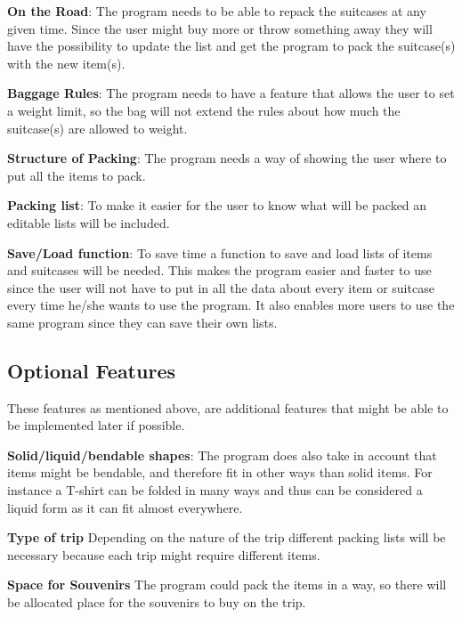 \textbf{On the Road}:
The program needs to be able to repack the suitcases at any given time. Since the user might buy more or throw something away they will have the possibility to update the list and get the program to pack the suitcase(s) with the new item(s).
\newline

\textbf{Baggage Rules}:
The program needs to have a feature that allows the user to set a weight limit, so the bag will not extend the rules about how much the suitcase(s) are allowed to weight.
\newline

\textbf{Structure of Packing}:
The program needs a way of showing the user where to put all the items to pack.
\newline

\textbf{Packing list}:
To make it easier for the user to know what will be packed an editable lists will be included.
\newline

\textbf{Save/Load function}:
To save time a function to save and load lists of items and suitcases will be needed. This makes the program easier and faster to use since the user will not have to put in all the data about every item or suitcase every time he/she wants to use the program. It also enables more users to use the same program since they can save their own lists.
\newline

\subsection{Optional Features}
These features as mentioned above, are additional features that might be able to be implemented later if possible.\newline

\textbf{Solid/liquid/bendable shapes}:
The program does also take in account that items might be bendable, and therefore fit in other ways than solid items. For instance a T-shirt can be folded in many ways and thus can be considered a liquid form as it can fit almost everywhere.
\newline

\textbf{Type of trip}
Depending on the nature of the trip different packing lists will be necessary because each trip might require different items.
\newline

\textbf{Space for Souvenirs}
The program could pack the items in a way, so there will be allocated place for the souvenirs to buy on the trip.
\newline
